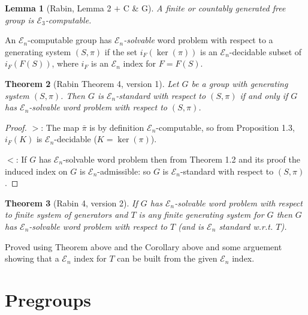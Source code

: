 \documentclass[12pt,a4paper,draft]{article}
\newcommand\cE{\mathcal{E}}
\newtheorem{theorem}{{\bf Theorem}}[section]
\newtheorem{lemma}[theorem]{{\bf Lemma}}
\begin{document}
\begin{lemma}[Rabin, Lemma 2 $+$ C \& G]
A finite or countably generated free group is $\cE_3$-computable.
\end{lemma}

An $\cE_n$-computable  group 
has $\cE_n${\em -solvable} word problem with respect to a generating system
$(S,\pi)$ if the set $i_F(\ker(\pi))$ is an $\cE_n$-decidable subset of $i_F(F(S))$, where $i_F$ is an $\cE_n$ index for $F=F(S)$. 

\begin{theorem}[Rabin Theorem 4, version 1]
Let $G$ be a group with generating system $(S,\pi)$. Then $G$ is 
$\cE_n$-standard with respect to $(S,\pi)$ if and only if 
$G$ has $\cE_n$-solvable word problem with respect to $(S,\pi)$. 
\end{theorem}
\begin{proof}
$>$: The map $\bar\pi$ is by definition $\cE_n$-computable, so from 
Proposition 1.3, $i_F(K)$ is $\cE_n$-decidable ($K=\ker(\pi)$). 

$<$: If $G$ has $\cE_n$-solvable word problem then from Theorem 1.2 and 
its proof  the induced index on $G$ is $\cE_n$-admissible: so $G$ 
is $\cE_n$-standard with respect to $(S,\pi)$.
\end{proof}
\begin{theorem}[Rabin 4, version 2]
If $G$ has $\cE_n$-solvable word problem with respect to finite system
of generators and $T$ is any finite generating system for $G$ then
$G$ has $\cE_n$-solvable word problem with respect to $T$ (and is
$\cE_n$ standard w.r.t. $T$).
\end{theorem}
Proved using Theorem above and the Corollary above and some arguement
showing that a $\cE_n$ index for $T$ can be built from the given 
$\cE_n$ index. 
\section{Pregroups}\label{sec:pregroups}
\end{document}
